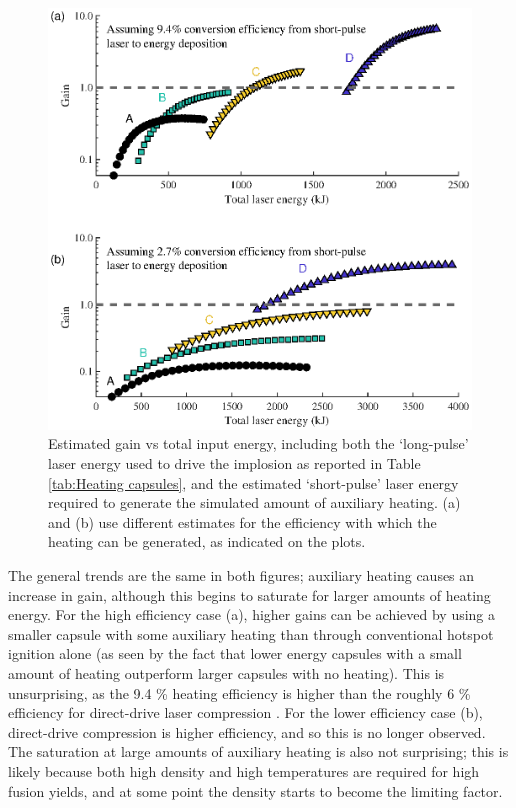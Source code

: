 \begin{figure}[ht]
\centering
\includegraphics{figures/FurtherSims/HeatingGain.eps}
\caption{Estimated gain vs total input energy, including both the `long-pulse' laser energy used to drive the implosion as reported in Table \ref{tab:Heating capsules}, and the estimated `short-pulse' laser energy required to generate the simulated amount of auxiliary heating. (a) and (b) use different estimates for the efficiency with which the heating can be generated, as indicated on the plots.}
\label{fig:HeatedGain}
\end{figure}

The general trends are the same in both figures; auxiliary heating causes an increase in gain, although this begins to saturate for larger amounts of heating energy. For the high efficiency case (a), higher gains can be achieved by using a smaller capsule with some auxiliary heating than through conventional hotspot ignition alone (as seen by the fact that lower energy capsules with a small amount of heating outperform larger capsules with no heating). This is unsurprising, as the 9.4 \% heating efficiency is higher than the roughly 6 \% efficiency for direct-drive laser compression \cite{Campbell2017, Goncharov2016}. For the lower efficiency case (b), direct-drive compression is higher efficiency, and so this is no longer observed. The saturation at large amounts of auxiliary heating is also not surprising; this is likely because both high density and high temperatures are required for high fusion yields, and at some point the density starts to become the limiting factor.

